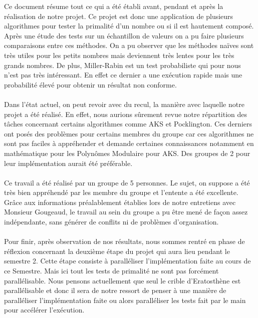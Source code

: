 	Ce document résume tout ce qui a été établi avant, pendant et après la réalisation de notre projet. Ce projet est donc une application de plusieurs algorithmes pour tester la primalité d'un nombre ou si il est hautement composé. Après une étude des tests sur un échantillon de valeurs on a pu faire plusieurs comparaisons entre ces méthodes. On a pu observer que les méthodes naïves sont très utiles pour les petits nombres mais deviennent très lentes pour les très grands nombres. De plus, Miller-Rabin est un test probabiliste qui pour nous n'est pas très intéressant. En effet ce dernier a une exécution rapide mais une probabilité élevé pour obtenir un résultat non conforme.
		\paragraph{} Dans l'état actuel, on peut revoir avec du recul, la manière avec laquelle notre projet a été réalisé. En effet, nous aurions sûrement revue notre répartition des tâches concernant certains algorithmes comme AKS et Pocklington. Ces derniers ont posés des problèmes pour certains membres du groupe car ces algorithmes ne sont pas faciles à appréhender et demande certaines connaissances notamment en mathématique pour les Polynômes Modulaire pour AKS. Des groupes de 2 pour leur implémentation aurait été préférable.
		\paragraph{} Ce travail a été réalisé par un groupe de 5 personnes. Le sujet, on suppose a été très bien appréhendé par les membre du groupe et l'entente a été excellente. Grâce aux informations préalablement établies lors de notre entretiens avec Monsieur Gougeaud, le travail au sein du groupe a pu être mené de façon assez indépendante, sans générer de conflits ni de problèmes d'organisation.		
		\paragraph{} Pour finir, après observation de nos résultats, nous sommes rentré en phase de réflexion concernant la deuxième étape du projet qui aura lieu pendant le semestre 2. Cette étape consiste à paralléliser l'implémentation faite au cours de ce Semestre. Mais ici tout les tests de primalité ne sont pas forcément parallélisable. Nous pensons actuellement que seul le crible d'Eratosthène est parallélisable et donc il sera de notre ressort de penser à une manière de paralléliser l'implémentation faite ou alors paralléliser les tests fait par le main pour accélérer l'exécution.

